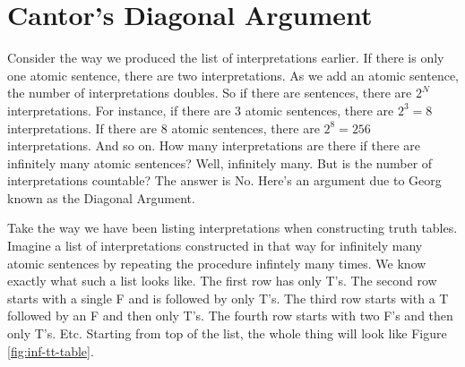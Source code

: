 \section{Cantor's Diagonal Argument}\label{sec:diagonalization}

Consider the way we produced the list of interpretations earlier. If there is only one 
atomic sentence, there are two interpretations. As we add an atomic sentence, the number 
of interpretations doubles.  So if there are  sentences, there are $2^N$ interpretations.   
For instance, if there are 3 atomic sentences, there are $2^3=8$ interpretations.  If 
there are 8 atomic sentences, there are $2^8=256$ interpretations. And so on.  
How many interpretations are there if there  are infinitely many atomic 
sentences?  Well, infinitely many. But is the number of interpretations 
countable? The answer is No.  Here's an argument due to Georg \citet{Cantor1891} 
known as the Diagonal Argument.








Take the way we have been listing interpretations when constructing truth tables.  
Imagine a list of interpretations constructed in that way for infinitely many 
atomic sentences by repeating the procedure infintely many times. We know 
exactly what such a list looks like.  The first row has only T's. The second row 
starts with a single F and is followed by only T's.  The third row starts with a 
T followed by an F and then only T's. The fourth row starts with two F's and 
then only T's.  Etc.  Starting from top of the list, the whole thing will look 
like Figure \ref{fig:inf-tt-table}.


